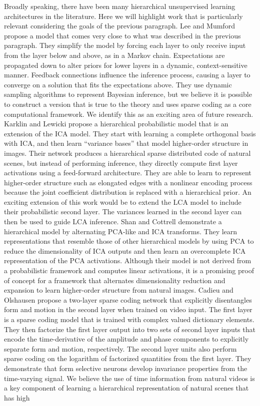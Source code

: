 Broadly speaking, there have been many hierarchical unsupervised learning architectures in the literature. Here we will highlight work that is particularly relevant considering the goals of the previous paragraph. Lee and Mumford \citeyearpar{lee2003hierarchical} propose a model that comes very close to what was described in the previous paragraph. They simplify the model by forcing each layer to only receive input from the layer below and above, as in a Markov chain. Expectations are propagated down to alter priors for lower layers in a dynamic, context-sensitive manner. Feedback connections influence the inference process, causing a layer to converge on a solution that fits the expectations above. They use dynamic sampling algorithms to represent Bayesian inference, but we believe it is possible to construct a version that is true to the theory and uses sparse coding as a core computational framework. We identify this as an exciting area of future research. Karklin and Lewicki \citeyearpar{karklin2003learning} propose a hierarchical probabilistic model that is an extension of the ICA model. They start with learning a complete orthogonal basis with ICA, and then learn ``variance bases'' that model higher-order structure in images. Their network produces a hierarchical sparse distributed code of natural scenes, but instead of performing inference, they directly compute first layer activations using a feed-forward architecture. They are able to learn to represent higher-order structure such as elongated edges with a nonlinear encoding process because the joint coefficient distribution is replaced with a hierarchical prior. An exciting extension of this work would be to extend the LCA model to include their probabilistic second layer. The variances learned in the second layer can then be used to guide LCA inference. Shan and Cottrell \citeyearpar{shan2013efficient}  demonstrate a hierarchical model by alternating PCA-like and ICA transforms. They learn representations that resemble those of other hierarchical models by using PCA to reduce the dimensionality of ICA outputs and then learn an overcomplete ICA \parencite{le2011ica} representation of the PCA activations. Although their model is not derived from a probabilistic framework and computes linear activations, it is a promising proof of concept for a framework that alternates dimensionality reduction and expansion to learn higher-order structure from natural images. Cadieu and Olshausen \citeyearpar{cadieu2008learning} propose a two-layer sparse coding network that explicitly disentangles form and motion in the second layer when trained on video input. The first layer is a sparse coding model that is trained with complex valued dictionary elements. They then factorize the first layer output into two sets of second layer inputs that encode the time-derivative of the amplitude and phase components to explicitly separate form and motion, respectively. The second layer units also perform sparse coding on the logarithm of factorized quantities from the first layer. They demonstrate that form selective neurons develop invariance properties from the time-varying signal. We believe the use of time information from natural videos is a key component of learning a hierarchical representation of natural scenes that has high 